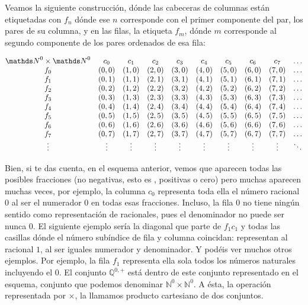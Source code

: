 \documentclass{amsart}
\theoremstyle{definition}
\theoremstyle{remark}
\numberwithin{equation}{section}
\newcommand{\setN}{\mathds N}
\newcommand{\setQ}{\mathds Q}
\begin{document}
	Veamos la siguiente construcción, dónde las cabeceras de columnas están 
etiquetadas con $f_n$ dónde ese $n$ corresponde con el primer componente del 
par, los pares de su columna, y en las filas, la etiqueta $f_m$, dónde $m$ 
corresponde al segundo componente de los pares ordenados de esa fila:


\newcommand{\ordpairlist}[1]{\ordpair{0}{#1} & \ordpair{1}{#1} &
                             \ordpair{2}{#1} & \ordpair{3}{#1} &
                             \ordpair{4}{#1} & \ordpair{5}{#1} &
                             \ordpair{6}{#1} & \ordpair{7}{#1} }
$$
\begin{matrix}
  {\setN}^{0}\times{\setN}^{0} & c_0 & c_1 & c_2 & c_3 & c_4 & c_5 & c_6 &
  c_7 & \ldots \\
  f_0 & \ordpairlist{0} & \ldots\\
  f_1 & \ordpairlist{1} & \ldots\\
  f_2 & \ordpairlist{2} & \ldots\\
  f_3 & \ordpairlist{3} & \ldots\\
  f_4 & \ordpairlist{4} & \ldots\\
  f_5 & \ordpairlist{5} & \ldots\\
  f_6 & \ordpairlist{6} & \ldots\\
  f_7 & \ordpairlist{7} & \ldots\\
  \vdots & \vdots & \vdots & \vdots & \vdots & \vdots & \vdots & \vdots & 
  \vdots & \ddots \\
\end{matrix}
$$


	Bien, si te das cuenta, en el esquema anterior, vemos que aparecen todas 
las posibles fracciones (no negativas, esto es , positivas o cero) pero 
muchas aparecen muchas veces, por ejemplo, la columna $c_0$ representa toda 
ella el número racional $0$ al ser el numerador $0$ en todas esas fracciones. 
Incluso, la fila $0$ no tiene ningún sentido como representación de 
racionales, pues el denominador no puede ser nunca $0$.
El siguiente ejemplo sería la diagonal que parte de $f_1 c_1$ y todas las 
casillas dónde el número subíndice de fila y columna coincidan: representan 
al racional $1$, al ser iguales numerador y denominador. Y podéis ver muchos 
otros ejemplos. Por ejemplo, la fila $f_1$ representa ella sola todos los 
números naturales incluyendo el $0$. El conjunto $\setQ^{0,+}$ está dentro de 
este conjunto representado en el esquema, conjunto que podemos denominar 
$\setN^0\times\setN^0$. A ésta, la operación 
representada por $\times$, la llamamos producto cartesiano de dos conjuntos.
\end{document}
